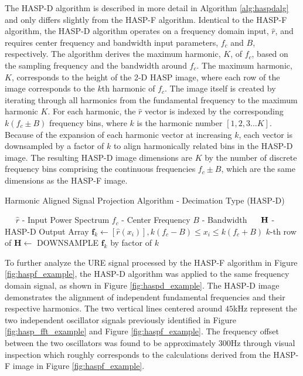The HASP-D algorithm is described in more detail in Algorithm \ref{alg:haspdalg} and only differs slightly from the HASP-F algorithm. Identical to the HASP-F algorithm, the HASP-D algorithm operates on a frequency domain input, $\hat{r}$, and requires center frequency and bandwidth input parameters, $f_c$ and $B$, respectively.  The algorithm derives the maximum harmonic, $K$, of $f_c$, based on the sampling frequency and the bandwidth around $f_c$. The maximum harmonic, $K$, corresponds to the height of the 2-D HASP image, where each row of the image corresponds to the $k$th harmonic of $f_c$. The image itself is created by iterating through all harmonics from the fundamental frequency to the maximum harmonic $K$.  For each harmonic, the $\hat{r}$ vector is indexed by the corresponding $k(f_c \pm B)$ frequency bins, where $k$ is the harmonic number $\left[1,2,3 \ldots{} K \right]$.  Because of the expansion of each harmonic vector at increasing $k$, each vector is downsampled by a factor of $k$ to align harmonically related bins in the HASP-D image.  The resulting HASP-D image dimensions are $K$ by the number of discrete frequency bins comprising the continuous frequencies $f_c \pm B$, which are the same dimensions as the HASP-F image.

\begin{algorithm}
	\caption{Harmonic Aligned Signal Projection Algorithm - Decimation Type (HASP-D)} \label{alg:haspdalg}
	\scriptsize
	\begin{algorithmic}[1]
		\Require~~
		\Statex $\hat{r}$ - Input Power Spectrum
		\Statex $f_c$ - Center Frequency 
		\Statex $B$ - Bandwidth
		\Ensure~~
		\Statex $\bf{H}$ - HASP-D Output Array
		\Statex
		\State    $\mathbf{f}_k \gets \left[ \hat{r}(x_i) \right], k(f_c - B) \leq x_i \leq k(f_c + B)$
		\State		$k$-th row of $\mathbf{H} \gets$ DOWNSAMPLE $\mathbf{f}_k$ by factor of $k$
		\EndFor
	\end{algorithmic}
\end{algorithm}

To further analyze the URE signal processed by the HASP-F algorithm in Figure \ref{fig:haspf_example}, the HASP-D algorithm was applied to the same frequency domain signal, as shown in Figure \ref{fig:haspd_example}.  The HASP-D image demonstrates the alignment of independent fundamental frequencies and their respective harmonics.  The two vertical lines centered around $45$kHz represent the two independent oscillator signals previously identified in Figure \ref{fig:hasp_fft_example} and Figure \ref{fig:haspf_example}.  The frequency offset between the two oscillators was found to be approximately $300$Hz through visual inspection which roughly corresponds to the calculations derived from the HASP-F image in Figure \ref{fig:haspf_example}.


